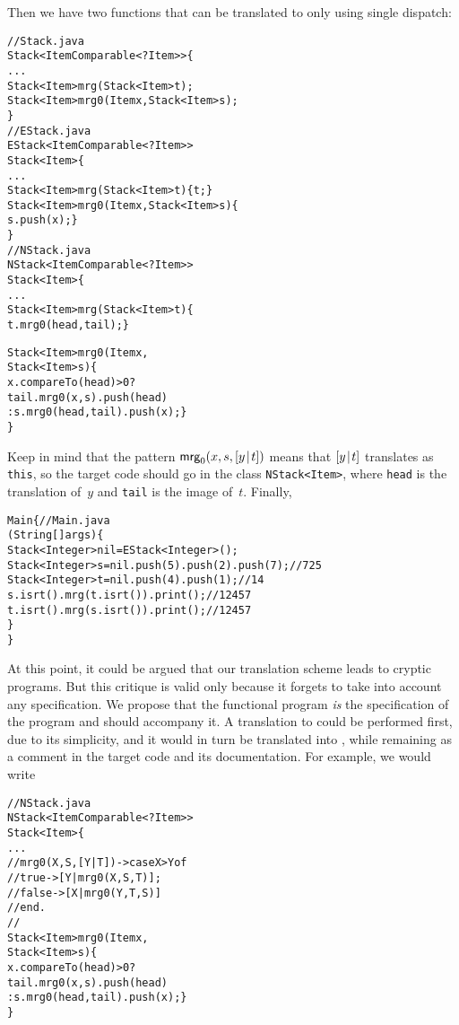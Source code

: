 Then we have two functions that can be translated to \Java only using
single dispatch:
\begin{alltt}
// Stack.java
\public \abstractX
\class Stack<Item \extends Comparable<? \super Item>> \{
  ...
  \public \abstractX Stack<Item> mrg(\final Stack<Item> t);
  \public \abstractX
  Stack<Item> mrg0(\final Item x, \final Stack<Item> s);
\}
// EStack.java
\public \class EStack<Item \extends Comparable<? \super Item>>
       \extends Stack<Item> \{
  ...
  \public Stack<Item> mrg(\final Stack<Item> t) \{ \return t; \}
  \public Stack<Item> mrg0(\final\! Item x,\final Stack<Item> s)\{
    \return s.push(x); \}
\}
// NStack.java
\public \class NStack<Item \extends Comparable<? \super Item>>
       \extends Stack<Item> \{
  ...
  \public Stack<Item> mrg(\final Stack<Item> t) \{
    \return t.mrg0(head,tail); \}

  \public Stack<Item> mrg0(\final Item x,
                          \final Stack<Item> s) \{
    \return x.compareTo(head) > 0 ?
           tail.mrg0(x,s).push(head)
         : s.mrg0(head,tail).push(x); \}
\}
\end{alltt}
Keep in mind that the pattern \(\textsf{mrg}_0(x,s,[{y}\!\mid\!{t}])\) means
that \([{y}\!\mid\!{t}]\) translates as \texttt{this}, so the target code
should go in the class \texttt{NStack<Item>}, where \texttt{head} is
the translation of~\(y\) and \texttt{tail} is the image of~\(t\).
Finally,
\begin{alltt}
\public \class Main \{\hfill // Main.java
  \public \static \void \main (String[] args) \{
    Stack<Integer> nil = \new EStack<Integer>();
    Stack<Integer> s = nil.push(5).push(2).push(7);\hfill// 7 2 5
    Stack<Integer> t = nil.push(4).push(1);\hfill// 1 4
    s.isrt().mrg(t.isrt()).print();\hfill// 1 2 4 5 7
    t.isrt().mrg(s.isrt()).print();\hfill// 1 2 4 5 7
  \}
\}
\end{alltt}
At this point, it could be argued that our translation scheme leads to
cryptic \Java programs. But this critique is valid only because it
forgets to take into account any specification. We propose that the
functional program \emph{is} the specification of the \Java program
and should accompany it. A translation to \Erlang could be performed
first, due to its simplicity, and it would in turn be translated into
\Java, while remaining as a comment in the target code and its
documentation. For example, we would write
\begin{alltt}
// NStack.java
\public \class NStack<Item \extends Comparable<? \super Item>>
       \extends Stack<Item> \{
  ...
  // mrg0(X,S,[Y|T]) -> case X > Y of
  //                      true  -> [Y|mrg0(X,S,T)];
  //                      false -> [X|mrg0(Y,T,S)]
  //                    end.
  //
  \public Stack<Item> mrg0(\final Item x,
                          \final Stack<Item> s) \{
    \return x.compareTo(head) > 0 ?
           tail.mrg0(x,s).push(head)
         : s.mrg0(head,tail).push(x); \}
\}
\end{alltt}
